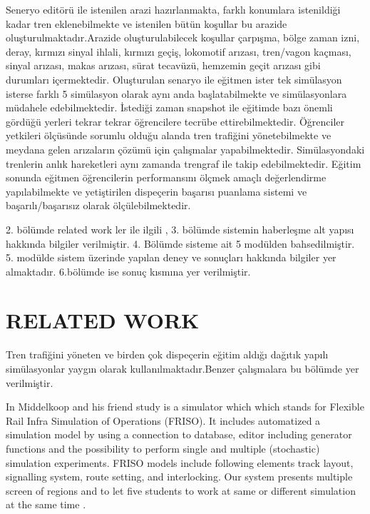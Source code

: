 \documentclass[conference]{IEEEtran}
\begin{document}
Seneryo editörü ile istenilen arazi hazırlanmakta, farklı konumlara istenildiği kadar tren eklenebilmekte ve istenilen bütün koşullar bu arazide oluşturulmaktadır.Arazide oluşturulabilecek koşullar çarpışma, bölge zaman izni, deray, kırmızı sinyal ihlali, kırmızı geçiş, lokomotif arızası, tren/vagon kaçması, sinyal arızası, makas arızası, sürat tecavüzü, hemzemin geçit arızası gibi durumları içermektedir. Oluşturulan senaryo ile eğitmen ister tek simülasyon isterse farklı 5 simülasyon olarak aynı anda başlatabilmekte ve simülasyonlara müdahele edebilmektedir. İstediği zaman snapshot ile eğitimde bazı önemli gördüğü yerleri tekrar tekrar öğrencilere tecrübe ettirebilmektedir. Öğrenciler yetkileri ölçüsünde sorumlu olduğu alanda tren trafiğini yönetebilmekte ve meydana gelen arızaların çözümü için çalışmalar yapabilmektedir. Simülasyondaki trenlerin anlık hareketleri aynı zamanda trengraf ile takip edebilmektedir. Eğitim sonunda eğitmen öğrencilerin performansını ölçmek amaçlı değerlendirme yapılabilmekte ve yetiştirilen dispeçerin başarısı puanlama sistemi ve başarılı/başarısız olarak ölçülebilmektedir.


2. bölümde related work ler ile ilgili , 3. bölümde sistemin haberleşme alt yapısı hakkında bilgiler verilmiştir. 4. Bölümde sisteme ait 5 modülden bahsedilmiştir. 5. modülde sistem üzerinde yapılan deney ve sonuçları hakkında bilgiler yer almaktadır. 6.bölümde ise sonuç kısmına yer verilmiştir.




\section{RELATED WORK}


Tren trafiğini yöneten ve birden çok dispeçerin eğitim aldığı dağıtık yapılı simülasyonlar yaygın olarak kullanılmaktadır.Benzer çalışmalara bu bölümde yer verilmiştir.


In Middelkoop and his friend study is a simulator which which stands for Flexible Rail Infra Simulation of Operations (FRISO). It includes automatized  a simulation model by using a connection to database, editor including generator functions and the possibility to perform single and multiple (stochastic) simulation experiments. FRISO models include following elements  track layout, signalling system, route setting, and interlocking. Our system presents multiple screen of regions and to let five students to work at same or different simulation at the same time \cite{FRISO}.
\end{document}

